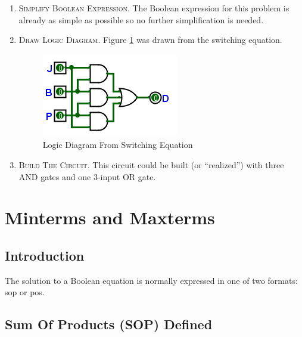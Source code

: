 \begin{enumerate}
  \item \textsc{Simplify Boolean Expression}. The Boolean expression for this problem is already as simple as possible so no further simplification is needed. 
  
  \item \textsc{Draw Logic Diagram}. Figure \ref{fig:05_01} was drawn from the switching equation.
  
	\begin{figure}[H]
		\centering
		\includegraphics[width=\maxwidth{.95\linewidth}]{gfx/05_01}
		\caption{Logic Diagram From Switching Equation}
		\label{fig:05_01}
	\end{figure}
  
  \item \textsc{Build The Circuit}. This circuit could be built (or ``realized'') with three \textsf{AND}  gates and one 3-input \textsf{OR}  gate. 
  
\end{enumerate}

\section{Minterms and Maxterms}
\label{05:sec:minterms_and_maxterms}

\subsection{Introduction}
\label{05:subsec:introduction_to_minterms_and_maxterms}

The solution to a Boolean equation is normally expressed in one of two formats: \gls{sop} or \gls{pos}.

\subsection{Sum Of Products (SOP) Defined}
\label{05:subsec:sum_of_products_sop_defined}

